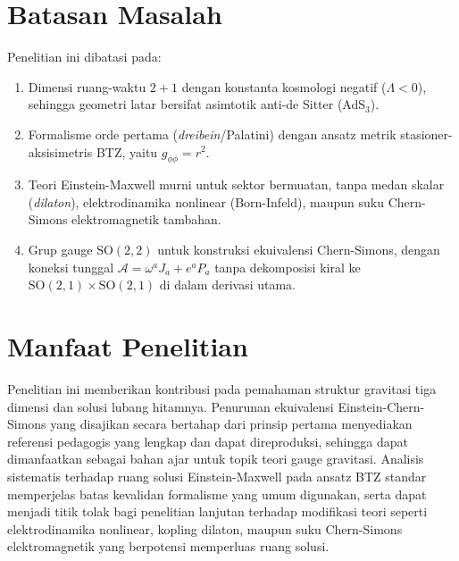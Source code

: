 \section{Batasan Masalah}
\noindent Penelitian ini dibatasi pada:
\begin{enumerate}[label=\arabic*.]
    \item Dimensi ruang-waktu $2+1$ dengan konstanta kosmologi negatif ($\Lambda < 0$), sehingga geometri latar bersifat asimtotik anti-de Sitter (AdS$_3$).
    \item Formalisme orde pertama (\textit{dreibein}/Palatini) dengan ansatz metrik stasioner-aksisimetris BTZ, yaitu $g_{\phi\phi} = r^2$.
    \item Teori Einstein-Maxwell murni untuk sektor bermuatan, tanpa medan skalar (\textit{dilaton}), elektrodinamika nonlinear (Born-Infeld), maupun suku Chern-Simons elektromagnetik tambahan.
    \item Grup gauge $\mathrm{SO}(2,2)$ untuk konstruksi ekuivalensi Chern-Simons, dengan koneksi tunggal $\mathcal{A} = \omega^a J_a + e^a P_a$ tanpa dekomposisi kiral ke $\mathrm{SO}(2,1) \times \mathrm{SO}(2,1)$ di dalam derivasi utama.
\end{enumerate}

\section{Manfaat Penelitian}
Penelitian ini memberikan kontribusi pada pemahaman struktur gravitasi tiga dimensi dan solusi lubang hitamnya. Penurunan ekuivalensi Einstein-Chern-Simons yang disajikan secara bertahap dari prinsip pertama menyediakan referensi pedagogis yang lengkap dan dapat direproduksi, sehingga dapat dimanfaatkan sebagai bahan ajar untuk topik teori gauge gravitasi. Analisis sistematis terhadap ruang solusi Einstein-Maxwell pada ansatz BTZ standar memperjelas batas kevalidan formalisme yang umum digunakan, serta dapat menjadi titik tolak bagi penelitian lanjutan terhadap modifikasi teori seperti elektrodinamika nonlinear, kopling dilaton, maupun suku Chern-Simons elektromagnetik yang berpotensi memperluas ruang solusi.

